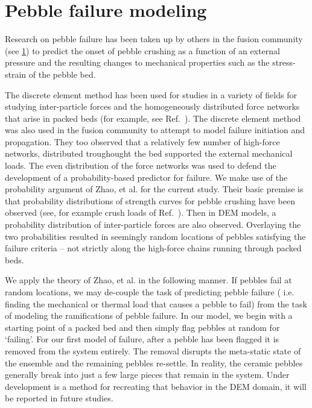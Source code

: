 
\section{Pebble failure modeling}
\label{sec:failure-discussion}
Research on pebble failure has been taken up by others in the fusion community (see \cref{sec:failure-discussion}) to predict the onset of pebble crushing as a function of an external pressure and the resulting changes to mechanical properties such as the stress-strain of the pebble bed. 



The discrete element method has been used for studies in a variety of fields for studying inter-particle forces and the homogeneously distributed force networks that arise in packed beds (for example, see Ref.~\cite{Makse2000}). The discrete element method was also used in the fusion community to attempt to model failure initiation and propagation\cite{Annabattula2012a, Zhao2012, Zhao2013}. They too observed that a relatively few number of high-force networks, distributed troughought the bed supported the external mechanical loads. The even distribution of the force networks was used to defend the development of a probability-based predictor for failure. We make use of the probability argument of Zhao, {et al.} for the current study\cite{Zhao2013}. Their basic premise is that probability distributions of strength curves for pebble crushing have been observed (see, for example crush loads of Ref.~\cite{Tsuchiya1998}). Then in DEM models, a probability distribution of inter-particle forces are also observed. Overlaying the two probabilities resulted in seemingly random locations of pebbles satisfying the failure criteria -- not strictly along the high-force chains running through packed beds.

We apply the theory of Zhao, { et al.} in the following manner. If pebbles fail at random locations, we may de-couple the task of predicting pebble failure ({ i.e.} finding the mechanical or thermal load that causes a pebble to fail) from the task of modeling the ramifications of pebble failure. In our model, we begin with a starting point of a packed bed and then simply flag pebbles at random for `failing'. For our first model of failure, after a pebble has been flagged it is removed from the system entirely. The removal disrupts the meta-static state of the ensemble and the remaining pebbles re-settle. In reality, the ceramic pebbles generally break into just a few large pieces that remain in the system. Under development is a method for recreating that behavior in the DEM domain, it will be reported in future studies.




